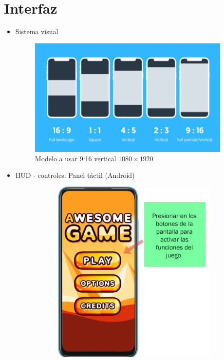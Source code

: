 \section{Interfaz}
\begin{itemize}
	\item Sistema visual
	      \begin{figure}[htb]
		      \centering
		      \includegraphics[width=0.95\textwidth]{Figures/0. General/sistema_visual.png}
		      \caption{Modelo a usar 9:16 vertical $1080 \times 1920$}
		      \label{fig:vista}
	      \end{figure}
	\item HUD - controles: Panel táctil (Android)
	      \begin{figure}[h!]
		      \centering
		      \begin{subfigure}[b]{0.35\linewidth}
			      \includegraphics[width=\linewidth]{Figures/0. General/phone.png}

\end{subfigure}
\end{figure}
\end{itemize}
